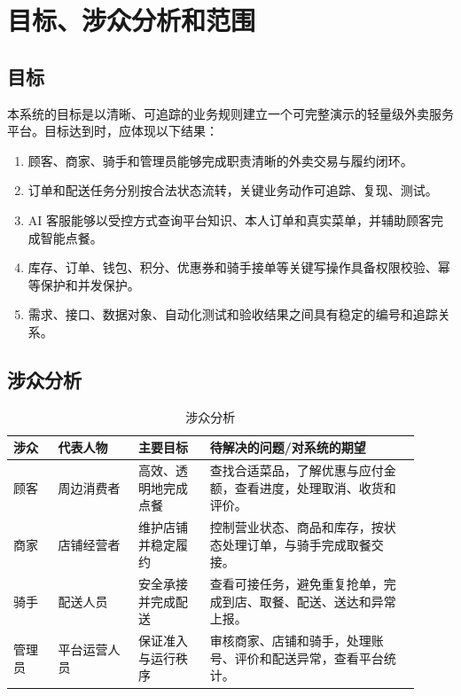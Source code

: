 \section{目标、涉众分析和范围}

\subsection{目标}

本系统的目标是以清晰、可追踪的业务规则建立一个可完整演示的轻量级外卖服务平台。目标达到时，应体现以下结果：

\begin{enumerate}
  \item 顾客、商家、骑手和管理员能够完成职责清晰的外卖交易与履约闭环。
  \item 订单和配送任务分别按合法状态流转，关键业务动作可追踪、复现、测试。
  \item AI 客服能够以受控方式查询平台知识、本人订单和真实菜单，并辅助顾客完成智能点餐。
  \item 库存、订单、钱包、积分、优惠券和骑手接单等关键写操作具备权限校验、幂等保护和并发保护。
  \item 需求、接口、数据对象、自动化测试和验收结果之间具有稳定的编号和追踪关系。
\end{enumerate}

\subsection{涉众分析}

\begin{longtable}{|L{0.10\linewidth}|L{0.18\linewidth}|L{0.16\linewidth}|L{0.47\linewidth}|}
\caption{涉众分析}\label{tab:stakeholders}\\ \hline
\textbf{涉众} & \textbf{代表人物} & \textbf{主要目标} & \textbf{待解决的问题/对系统的期望} \\ \hline
顾客 & 周边消费者 & 高效、透明地完成点餐 & 查找合适菜品，了解优惠与应付金额，查看进度，处理取消、收货和评价。 \\ \hline
商家 & 店铺经营者 & 维护店铺并稳定履约 & 控制营业状态、商品和库存，按状态处理订单，与骑手完成取餐交接。 \\ \hline
骑手 & 配送人员 & 安全承接并完成配送 & 查看可接任务，避免重复抢单，完成到店、取餐、配送、送达和异常上报。 \\ \hline
管理员 & 平台运营人员 & 保证准入与运行秩序 & 审核商家、店铺和骑手，处理账号、评价和配送异常，查看平台统计。 \\ \hline
\end{longtable}


